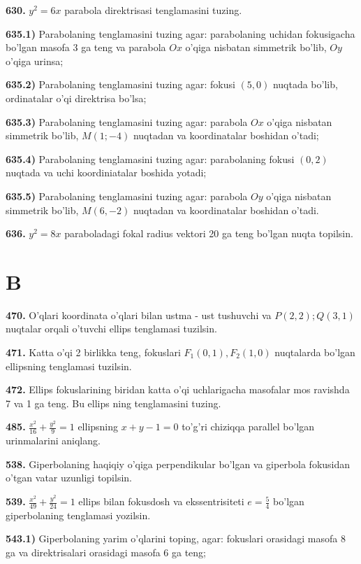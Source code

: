 \textbf{630.} $y^{2} = 6x$ parabola direktrisasi tenglamasini tuzing.

\textbf{635.1)} Parabolaning tenglamasini tuzing agar: parabolaning uchidan fokusigacha bo'lgan masofa 3 ga teng va parabola $Ox$ o'qiga nisbatan simmetrik bo'lib, $Oy$ o'qiga urinsa;

\textbf{635.2)} Parabolaning tenglamasini tuzing agar: fokusi $(5,0)$ nuqtada bo'lib, ordinatalar o'qi direktrisa bo'lsa;

\textbf{635.3)} Parabolaning tenglamasini tuzing agar: parabola $Ox$ o'qiga nisbatan simmetrik bo'lib, $M(1; - 4)$ nuqtadan va koordinatalar boshidan o'tadi;

\textbf{635.4)} Parabolaning tenglamasini tuzing agar: parabolaning fokusi $(0,2)$ nuqtada va uchi koordiniatalar boshida yotadi;

\textbf{635.5)} Parabolaning tenglamasini tuzing agar: parabola $Oy$ o'qiga nisbatan simmetrik bo'lib, $M(6, - 2)$ nuqtadan va koordinatalar boshidan o'tadi.

\textbf{636.} $y^{2} = 8x$ paraboladagi fokal radius vektori 20 ga teng bo'lgan nuqta topilsin.

\section{B}\label{b}

\textbf{470.} O'qlari koordinata o'qlari bilan ustma - ust tushuvchi va $P(2,2);Q(3,1)$ nuqtalar orqali o'tuvchi ellips tenglamasi tuzilsin.

\textbf{471.} Katta o'qi 2 birlikka teng, fokuslari $F_{1}(0,1),F_{2}(1,0)$ nuqtalarda bo'lgan ellipsning tenglamasi tuzilsin.

\textbf{472.} Ellips fokuslarining biridan katta o'qi uchlarigacha masofalar mos ravishda 7 va 1 ga teng. Bu ellips ning tenglamasini tuzing.

\textbf{485.} $\frac{x^{2}}{16} + \frac{y^{2}}{9} = 1$ ellipsning $x + y - 1 = 0$ to'g'ri chiziqqa parallel bo'lgan urinmalarini aniqlang.

\textbf{538.} Giperbolaning haqiqiy o'qiga perpendikular bo'lgan va giperbola fokusidan o'tgan vatar uzunligi topilsin.

\textbf{539.} $\frac{x^{2}}{49} + \frac{y^{2}}{24} = 1$ ellips bilan fokusdosh va ekssentrisiteti $e = \frac{5}{4}$ bo'lgan giperbolaning tenglamasi yozilsin.

\textbf{543.1)} Giperbolaning yarim o'qlarini toping, agar: fokuslari orasidagi masofa 8 ga va direktrisalari orasidagi masofa 6 ga teng;

